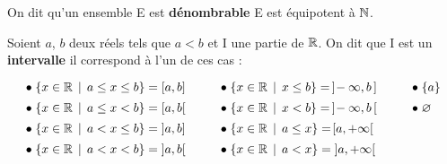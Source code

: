 \noindent On dit qu'un ensemble E est \textbf{dénombrable} \ssi E est équipotent à \(\mathbb{N}\).

\vspace{1cm}

\noindent Soient $a$, $b$ deux réels tels que $a<b$ et I une partie de $\mathbb{R}$. On dit que I est un \textbf{intervalle} \ssi il correspond à l'un de ces cas :
\[\def\arraystretch{1.4}\arraycolsep=0.5cm\begin{array}{lll}
    \bullet \; \{x\in\RR\,\mid\,a\leq x\leq b\}=[a,b]  & \bullet \; \{x\in\RR\,\mid\,x\leq b\}=\,]\!-\infty,b\,]  & \bullet \; \{a\} \\
    \bullet \; \{x\in\RR\,\mid\,a\leq x< b\}=[a,b[     & \bullet \; \{x\in\RR\,\mid\, x< b\}=\,]\!-\infty,b\,[    & \bullet \; \varnothing \\
    \bullet \; \{x\in\RR\,\mid\,a< x\leq b\}=\;]a,b]   & \bullet \; \{x\in\RR\,\mid\,a\leq x\}=\![a,+\infty[ & \\
    \bullet \; \{x\in\RR\,\mid\,a< x< b\}=\;]a,b[      & \bullet \; \{x\in\RR\,\mid\,a< x\}=\;]a,+\infty[ & \\
\end{array}\]

\vspace{1.5cm}